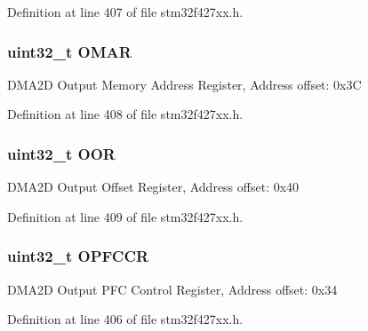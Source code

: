 Definition at line 407 of file stm32f427xx.\+h.

\subsubsection[{\texorpdfstring{O\+M\+AR}{OMAR}}]{ uint32\+\_\+t O\+M\+AR}\hypertarget{struct_d_m_a2_d___type_def_ab6be353d6107a8bb0641a438ac0eb93d}{}\label{struct_d_m_a2_d___type_def_ab6be353d6107a8bb0641a438ac0eb93d}
D\+M\+A2D Output Memory Address Register, Address offset\+: 0x3C 

Definition at line 408 of file stm32f427xx.\+h.

\subsubsection[{\texorpdfstring{O\+OR}{OOR}}]{ uint32\+\_\+t O\+OR}\hypertarget{struct_d_m_a2_d___type_def_afe934616b06edb746effd439206836a5}{}\label{struct_d_m_a2_d___type_def_afe934616b06edb746effd439206836a5}
D\+M\+A2D Output Offset Register, Address offset\+: 0x40 

Definition at line 409 of file stm32f427xx.\+h.

\subsubsection[{\texorpdfstring{O\+P\+F\+C\+CR}{OPFCCR}}]{ uint32\+\_\+t O\+P\+F\+C\+CR}\hypertarget{struct_d_m_a2_d___type_def_a79db32535165c766c9de2374a27ed059}{}\label{struct_d_m_a2_d___type_def_a79db32535165c766c9de2374a27ed059}
D\+M\+A2D Output P\+FC Control Register, Address offset\+: 0x34 

Definition at line 406 of file stm32f427xx.\+h.

